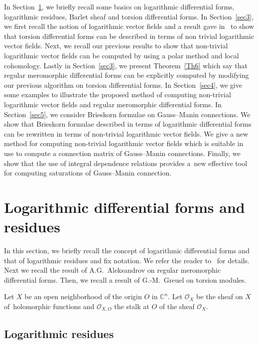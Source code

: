 \documentclass[pdftex]{sigma}%
\numberwithin{equation}{section}
\begin{document}
In Section~\ref{sec2}, we briefly recall some basics on logarithmic differential forms,
logarithmic residues, Barlet sheaf and torsion differential forms.
In Section~\ref{sec3}, we first recall the notion of logarithmic vector fields and a result
gave in~\cite{TN20} to show that torsion differential forms can be described
in terms of non trivial logarithmic vector fields. Next, we recall our previous
results to show that non-trivial logarithmic vector fields can be computed
by using a polar method and local cohomology. Lastly in Section~\ref{sec3}, we present
Theorem~\ref{Th6} which say that regular meromorphic differential forms can be
explicitly computed by modifying our previous algorithm on torsion differential
forms.
In Section~\ref{sec4}, we give some examples to illustrate the proposed method of computing
non-trivial logarithmic vector fields and regular meromorphic differential forms.
In Section~\ref{sec5}, we consider Brieskorn formulae on Gauss--Manin connections. We show
that Brieskorn formulae described in terms of logarithmic differential forms can be
rewritten in terms of non-trivial logarithmic vector fields. We give a new method for computing
non-trivial logarithmic vector fields which is suitable in use to compute a connection
matrix of Gauss--Manin connections. Finally, we show that the use of integral dependence relations
provides a~new effective tool for computing saturations of Gauss--Manin connection.

\section{Logarithmic differential forms and residues}\label{sec2}

In this section, we briefly recall the concept of logarithmic differential forms and that of loga\-rithmic residues and fix notation. We refer the reader to~\cite{S} for details. Next we recall the result of A.G.~Aleksandrov on regular meromorphic differential forms. Then, we recall a result of
G.-M.~Greuel on torsion modules.

Let $X$ be an open neighborhood of the origin $O$ in $ {\mathbb C}^n$. Let $ {\mathcal O}_X $ be the sheaf on $ X $ of~holo\-morphic functions and $ {\mathcal O}_{X,O} $ the stalk at $ O $ of the sheaf $ {\mathcal O}_X$.

\subsection{Logarithmic residues}
\end{document}
